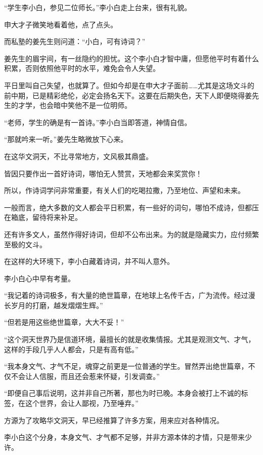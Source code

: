 
\begin{this_body}



“学生李小白，参见二位师长。”李小白走上台来，很有礼貌。

申大才子微笑地看着他，点了点头。

而私塾的姜先生则问道：“小白，可有诗词？”

姜先生的眉宇间，有一丝隐约的担忧。这个李小白才智中庸，但愿他平时有着什么积累，否则依照他平时的水平，难免会令人失望。

平日里叫自己失望，也就算了。但如今却是在申大才子面前……尤其是这场文斗的前中期，已是精彩绝伦，必定会扬名天下。这要在后期失色，天下人即便晓得姜先生的才学，也会暗中笑他不是一位明师。

“老师，学生的确是有一首诗。”李小白当即答道，神情自信。

“那就吟来一听。”姜先生略微放下心来。

在这华文洞天，不比寻常地方，文风极其鼎盛。

皆因只要作出一首好诗词，哪怕无人赞赏，天地都会来奖赏你！

所以，作诗词学问非常重要，有关人们的吃喝拉撒，乃至地位、声望和未来。

一般而言，绝大多数的文人都会平日积累，有一些好的词句，哪怕不成诗，但都压在箱底，留待将来补足。

还有许多文人，虽然作得好诗词，但却不公布出来。为的就是隐藏实力，应付频繁至极的文斗。

在这样的大环境下，李小白藏着诗词，并不叫人意外。

李小白心中早有考量。

“我记着的诗词极多，有大量的绝世篇章，在地球上名传千古，广为流传。经过漫长岁月的打磨，越发熠熠生辉。”

“但若是用这些绝世篇章，大大不妥！”

“这个洞天世界乃是信道环境，最擅长的就是收集情报。尤其是观测文气、才气，这样的手段几乎人人都会，只是有高有低。”

“我本身文气、才气不足，魂穿之前更是一位普通的学生。冒然弄出绝世篇章，不仅不会让人信服，而且还会惹来怀疑，引发调查。”

“即便自己事后说明，这并非自己所著，那也为时已晚。本身会被打上不诚的标签，在这个世界，会让人鄙视，乃至唾弃。”

方源为了攻略华文洞天，早已经推算了许多方案，用来应对各种情况。

李小白这个分身，本身文气、才气都不足够，并非方源本体的才情，只是带来少许。


\end{this_body}

